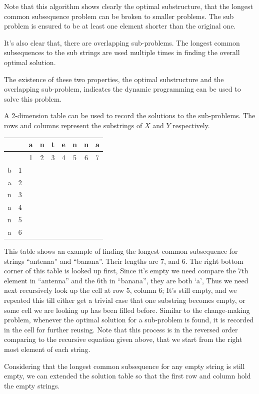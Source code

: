 \documentclass[UTF8]{article}
\begin{document}
Note that this algorithm shows clearly the optimal substructure, that the
longest common subsequence problem can be broken to smaller problems. The
sub problem is ensured to be at least one element shorter than the original
one.

It's also clear that, there are overlapping sub-problems. The longest
common subsequences to the sub strings are used multiple times in finding
the overall optimal solution.

The existence of these two properties, the optimal substructure and the
overlapping sub-problem, indicates the dynamic programming can be used
to solve this problem.

A 2-dimension table can be used to record the solutions to the sub-problems.
The rows and columns represent the substrings of $X$ and $Y$ respectively.

\begin{tabular}{|c|c|c|c|c|c|c|c|c|}
\hline
 & & a & n & t & e & n & n & a \\
\hline
 & & 1 & 2 & 3 & 4 & 5 & 6 & 7 \\
\hline
b & 1 & & & & & & & \\
\hline
a & 2 & & & & & & & \\
\hline
n & 3 & & & & & & & \\
\hline
a & 4 & & & & & & & \\
\hline
n & 5 & & & & & & & \\
\hline
a & 6 & & & & & & & \\
\hline
\end{tabular}

This table shows an example of finding the longest common subsequence for
strings ``antenna'' and ``banana''. Their lengths are 7, and 6. The right bottom
corner of this table is looked up first, Since it's empty we need compare
the 7th element in ``antenna'' and the 6th in ``banana'', they are both
`a', Thus we need next recursively look up the cell at row 5, column 6;
It's still empty, and we repeated this till either get a trivial case
that one substring becomes empty, or some cell we are looking up has
been filled before. Similar to the change-making problem, whenever the
optimal solution for a sub-problem is found, it is recorded in the cell
for further reusing. Note that this process is in the reversed order
comparing to the recursive equation given above, that we start from the
right most element of each string.

Considering that the longest common subsequence for any empty string is
still empty, we can extended the solution table so that the first row
and column hold the empty strings.
\end{document}
